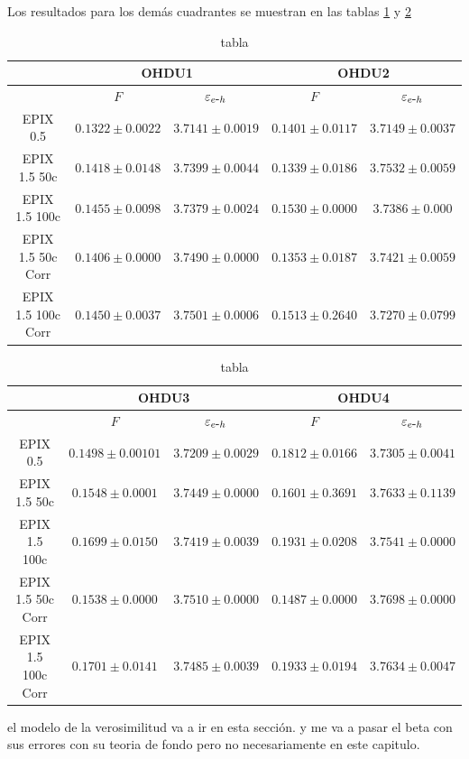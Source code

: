 Los resultados para los demás cuadrantes se muestran en las tablas \ref{tab:FanoEehOHDU1y2} y \ref{tab:FanoEehOHDU3y4}
\begin{table}[H]
\centering
\begin{tabular}{@{}ccccc@{}}
\toprule
                & \multicolumn{2}{c}{OHDU1}                 & \multicolumn{2}{c}{OHDU2}                 \\ \hline\hline
                & $F$                 & $\varepsilon_{e\mbox{-}h}$ & $F$                 & $\varepsilon_{e\mbox{-}h}$ \\
EPIX 0.5 & $0.1322 \pm 0.0022$ & $3.7141 \pm 0.0019$ & $0.1401 \pm 0.0117$ & $3.7149 \pm 0.0037$ \\ \hline
EPIX 1.5 50c & $0.1418 \pm 0.0148$ & $3.7399 \pm 0.0044$ & $0.1339 \pm 0.0186$ & $3.7532 \pm 0.0059$ \\
EPIX 1.5 100c & $0.1455 \pm 0.0098$ & $3.7379 \pm 0.0024$ & $0.1530 \pm 0.0000$ & $3.7386 \pm 0.000$ \\ \hline
EPIX 1.5 50c Corr & $0.1406 \pm 0.0000$ & $3.7490 \pm 0.0000$ & $0.1353 \pm 0.0187$ & $3.7421 \pm 0.0059$ \\
EPIX 1.5 100c Corr & $0.1450 \pm 0.0037$ & $3.7501 \pm 0.0006$ & $0.1513 \pm 0.2640$ & $3.7270 \pm 0.0799$ \\ \bottomrule \hline
\end{tabular}
\caption{tabla}
\label{tab:FanoEehOHDU1y2}
\end{table}
\begin{table}[H]
\centering
\begin{tabular}{@{}ccccc@{}}
\toprule
                & \multicolumn{2}{c}{OHDU3}                 & \multicolumn{2}{c}{OHDU4}                 \\ \hline\hline
                & $F$                 & $\varepsilon_{e\mbox{-}h}$ & $F$                 & $\varepsilon_{e\mbox{-}h}$ \\
EPIX 0.5 & $0.1498 \pm 0.00101$ & $3.7209 \pm 0.0029$ & $0.1812 \pm 0.0166$ & $3.7305 \pm 0.0041$ \\ \hline
EPIX 1.5 50c & $0.1548 \pm 0.0001$ & $3.7449 \pm 0.0000$ & $0.1601 \pm 0.3691$ & $3.7633 \pm 0.1139$ \\
EPIX 1.5 100c & $0.1699 \pm 0.0150$ & $3.7419 \pm 0.0039$ & $0.1931 \pm 0.0208$ & $3.7541 \pm 0.0000$ \\ \hline
EPIX 1.5 50c  Corr& $0.1538 \pm 0.0000$ & $3.7510 \pm 0.0000$ & $0.1487 \pm 0.0000$ & $3.7698 \pm 0.0000$ \\
EPIX 1.5 100c Corr& $0.1701 \pm 0.0141$ & $3.7485 \pm 0.0039$ & $0.1933 \pm 0.0194$ & $3.7634 \pm 0.0047$ \\ \bottomrule \hline
\end{tabular}
\caption{tabla}
\label{tab:FanoEehOHDU3y4}
\end{table}

el modelo de la verosimilitud va a ir en esta sección. y me va a pasar el beta con sus errores con su teoria de fondo pero no necesariamente en este capitulo.

